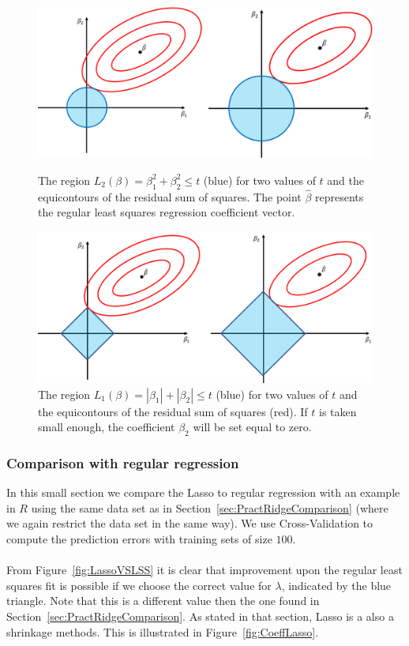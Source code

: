 \begin{figure}[h!]
    \centering
    \includegraphics[width = \linewidth]{Figures/RidgeContour.png}
    \caption{The region $L_2(\beta) = \beta_1^2 + \beta_2^2 \leqslant t$ (blue) for two values of $t$ and the equicontours of the residual sum of squares. The point $\hat{\beta}$ represents the regular least squares regression coefficient vector.}
    \label{fig:RidgeContour}
    \vspace{10pt}
    \includegraphics[width = \linewidth]{Figures/LassoContour.png}
    \caption{The region $L_1(\beta) = |\beta_1|+|\beta_2| \leqslant t$ (blue) for two values of $t$ and the equicontours of the residual sum of squares (red). If $t$ is taken small enough, the coefficient $\beta_2$ will be set equal to zero.}
    \label{fig:LassoContour}
\end{figure}


\subsubsection{Comparison with regular regression}
In this small section we compare the Lasso to regular regression with an example in $R$ using the same data set as in Section~\ref{sec:PractRidgeComparison} (where we again restrict the data set in the same way). We use Cross-Validation to compute the prediction errors with training sets of size $100$.\\
\\
From Figure~\ref{fig:LassoVSLSS} it is clear that improvement upon the regular least squares fit is possible if we choose the correct value for $\lambda$, indicated by the blue triangle. Note that this is a different value then the one found in Section~\ref{sec:PractRidgeComparison}. As stated in that section, Lasso is a also a shrinkage methods. This is illustrated in Figure~\ref{fig:CoeffLasso}.

